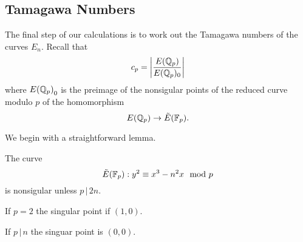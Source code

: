 \documentclass[12pt, a4paper]{amsart}
\begin{document}
\subsection{Tamagawa Numbers}

The final step of our calculations is to work out the Tamagawa numbers of the
curves $E_n$. Recall that
\[ c_p = \left| \frac{E({\mathbb Q}_p)}{E({\mathbb Q}_p)_0} \right|\]
where ${E({\mathbb Q}_p)}_0$ is the preimage of the nonsigular points of the reduced curve
modulo $p$ of the homomorphism
\[ {E({\mathbb Q}_p)} \rightarrow {\tilde{E}(\mathbb{F}_p)}.\]

We begin with a straightforward lemma.

\begin{lemma}
  The curve
  \[ {\tilde{E}(\mathbb{F}_p)} : y^2 \equiv x^3 - n^2x \mod{p}\]
  is nonsigular unless $p \, | \, 2n$.

  If $p = 2$ the singular point if $(1,0)$.

  If $p \, | \, n$ the singuar point is $(0,0)$.

\end{lemma}
\end{document}
